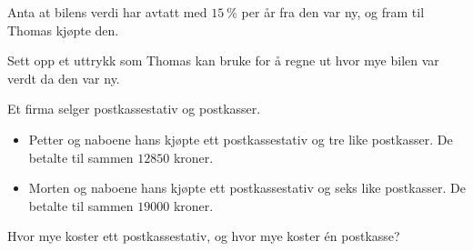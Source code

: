 \begin{figure}[H]
  \caption{}
  \label{fig:Forkurs-1p-2p-laererutdanning-2017-V-oppgave-1-6}
\end{figure}

Anta at bilens verdi har avtatt med $\SI{15}{\percent}$ per år fra den var ny,
og fram til Thomas kjøpte den.

\begin{oppgaver}
   Sett opp et uttrykk som Thomas kan bruke for å regne ut hvor mye
    bilen var verdt da den var ny.
\end{oppgaver}


\Oppgave[4]

Et firma selger postkassestativ og postkasser.

\begin{itemize}
  \item Petter og naboene hans kjøpte ett postkassestativ og tre like
    postkasser. De betalte til sammen $\num{12850}$ kroner.
  \item Morten og naboene hans kjøpte ett postkassestativ og seks like
    postkasser. De betalte til sammen $\num{19000}$ kroner.
\end{itemize}

\begin{oppgaver}
   Hvor mye koster ett postkassestativ, og hvor mye koster én
    postkasse?
\end{oppgaver}

